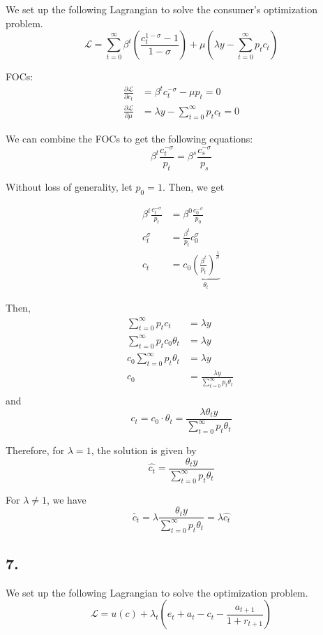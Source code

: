 \documentclass[12pt]{article}
\theoremstyle{definition}
\begin{document}
We set up the following Lagrangian to solve the consumer's optimization problem.
\[
\mathcal{L} = 
\sum_{t=0}^{\infty} \beta^t \left( \frac{c_t^{1-
\sigma}-1}{1-\sigma} \right)  + \mu( \lambda y-\sum_{t=0}^{\infty} p_t c_t)
\]

FOCs:
\[
\begin{split}
\frac{\partial \mathcal{L}}{\partial c_t} &= \beta^t c_t^{-\sigma}-\mu p_t = 0 \\
\frac{\partial \mathcal{L}}{\partial \mu} &= \lambda y- \sum_{t=0}^{\infty} p_t c_t = 0
\end{split}
\]

We can combine the FOCs to get the following equations:
\[
\boxed{
	\beta^t \frac{c_t^{-\sigma}}{p_t} = \beta^s \frac{c_s^{-\sigma}}{p_s}
}
\]

Without loss of generality, let $p_0=1$. Then, we get

\[
\begin{split}
\beta^t \frac{c_t^{-\sigma}}{p_t} & = \beta^0 \frac{c_0^{-\sigma}}{p_0}\\
c_t^\sigma & = \frac{\beta^t}{p_t} c_0^\sigma \\
c_t & = c_0 \underbrace{\left( \frac{\beta^t}{p_t}\right) ^\frac{1}{\sigma}}_{\theta_t}
\end{split}
\]

Then,
\[
\begin{split}
\sum_{t=0}^{\infty} p_t c_t & = \lambda y \\
\sum_{t=0}^{\infty} p_t c_0 \theta_t & = \lambda y \\
c_0 \sum_{t=0}^{\infty} p_t \theta_t & = \lambda y \\
c_0 & = \frac{\lambda y}{\sum_{t=0}^{\infty} p_t \theta_t} \  \\
\end{split}
\]
and
\[
c_t = c_0 \cdot \theta_t = \frac{\lambda \theta_t y}{\sum_{t=0}^{\infty} p_t \theta_t} 
\]

Therefore, for $\lambda=1$, the solution is given by
\[
\hat{c_t} = \frac{ \theta_t y }{\sum_{t=0}^{\infty} p_t \theta_t} 
\]

For $\lambda\neq 1$, we have
\[
\tilde{c_t} = \lambda \frac{ \theta_ty}{\sum_{t=0}^{\infty} p_t \theta_t} = \lambda \hat{c_t}
\]

\subsection*{7.}

We set up the following Lagrangian to solve the optimization problem.
\[
\mathcal{L} = u(c)  + \lambda_t (e_t+a_{t}-c_t-\frac{a_{t+1}}{1+r_{t+1}})
\]
\end{document}
